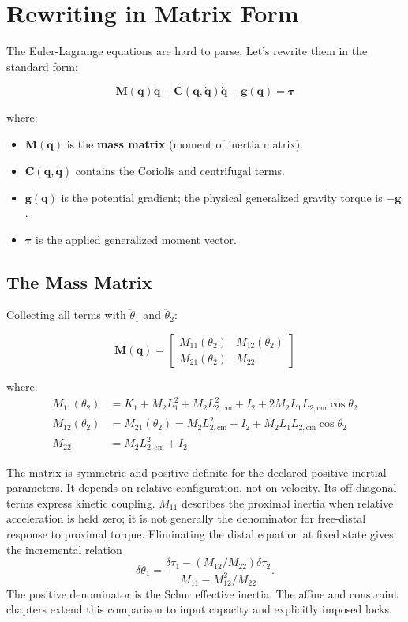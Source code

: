 \section{Rewriting in Matrix Form}

The Euler-Lagrange equations are hard to parse. Let's rewrite them in the standard form:

\begin{equation}
\bm{M}(\bm{q}) \ddot{\bm{q}} + \bm{C}(\bm{q}, \dot{\bm{q}}) \dot{\bm{q}} + \bm{g}(\bm{q}) = \bm{\tau}
\label{eq:ch03_manipulator}
\end{equation}

where:
\begin{itemize}
\item $\bm{M}(\bm{q})$ is the \textbf{mass matrix} (moment of inertia matrix).
\item $\bm{C}(\bm{q}, \dot{\bm{q}})$ contains the Coriolis and centrifugal terms.
\item $\bm{g}(\bm{q})$ is the potential gradient; the physical generalized gravity torque is $-\bm g$.
\item $\bm{\tau}$ is the applied generalized moment vector.
\end{itemize}

\subsection*{The Mass Matrix}

Collecting all terms with $\ddot{\theta}_1$ and $\ddot{\theta}_2$:

\begin{equation}
\bm{M}(\bm{q}) = \begin{bmatrix}
M_{11}(\theta_2) & M_{12}(\theta_2) \\
M_{21}(\theta_2) & M_{22}
\end{bmatrix}
\label{eq:ch03_mass_matrix}
\end{equation}

where:
\begin{align}
M_{11}(\theta_2) &= K_1 + M_2 L_1^2 + M_2 L_{2,\text{cm}}^2 + I_2 + 2 M_2 L_1 L_{2,\text{cm}} \cos \theta_2 \\
M_{12}(\theta_2) &= M_{21}(\theta_2) = M_2 L_{2,\text{cm}}^2 + I_2 + M_2 L_1 L_{2,\text{cm}} \cos \theta_2 \\
M_{22} &= M_2 L_{2,\text{cm}}^2 + I_2
\end{align}


The matrix is symmetric and positive definite for the declared positive inertial parameters. It depends on relative configuration, not on velocity. Its off-diagonal terms express kinetic coupling. $M_{11}$ describes the proximal inertia when relative acceleration is held zero; it is not generally the denominator for free-distal response to proximal torque. Eliminating the distal equation at fixed state gives the incremental relation
\[
\delta\ddot\theta_1=
\frac{\delta\tau_1-(M_{12}/M_{22})\delta\tau_2}
{M_{11}-M_{12}^2/M_{22}}.
\]
The positive denominator is the Schur effective inertia. The affine and constraint chapters extend this comparison to input capacity and explicitly imposed locks.


